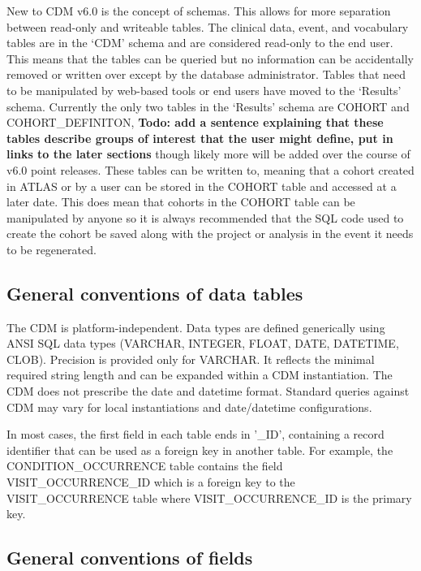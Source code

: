 \documentclass[11pt]{book}
\begin{document}
New to CDM v6.0 is the concept of schemas. This allows for more
separation between read-only and writeable tables. The clinical data,
event, and vocabulary tables are in the `CDM' schema and are considered
read-only to the end user. This means that the tables can be queried but
no information can be accidentally removed or written over except by the
database administrator. Tables that need to be manipulated by web-based
tools or end users have moved to the `Results' schema. Currently the
only two tables in the `Results' schema are COHORT and
COHORT\_DEFINITON, \textbf{Todo: add a sentence explaining that these
tables describe groups of interest that the user might define, put in
links to the later sections} though likely more will be added over the
course of v6.0 point releases. These tables can be written to, meaning
that a cohort created in ATLAS or by a user can be stored in the COHORT
table and accessed at a later date. This does mean that cohorts in the
COHORT table can be manipulated by anyone so it is always recommended
that the SQL code used to create the cohort be saved along with the
project or analysis in the event it needs to be regenerated.

\subsection{General conventions of data
tables}\label{general-conventions-of-data-tables}

The CDM is platform-independent. Data types are defined generically
using ANSI SQL data types (VARCHAR, INTEGER, FLOAT, DATE, DATETIME,
CLOB). Precision is provided only for VARCHAR. It reflects the minimal
required string length and can be expanded within a CDM instantiation.
The CDM does not prescribe the date and datetime format. Standard
queries against CDM may vary for local instantiations and date/datetime
configurations.

In most cases, the first field in each table ends in '\_ID', containing
a record identifier that can be used as a foreign key in another table.
For example, the CONDITION\_OCCURRENCE table contains the field
VISIT\_OCCURRENCE\_ID which is a foreign key to the VISIT\_OCCURRENCE
table where VISIT\_OCCURRENCE\_ID is the primary key.

\subsection{General conventions of
fields}\label{general-conventions-of-fields}
\end{document}
